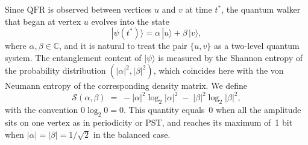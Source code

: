\documentclass[12pt]{amsart}
\newcommand{\QFR}{\mathrm{QFR}}
\begin{document}
Since $\QFR$ is observed between vertices $u$ and $v$ at time $t^*$, the quantum walker that
began at vertex $u$ evolves into the state
\[
  |\psi(t^*)\rangle = \alpha\,|u\rangle + \beta\,|v\rangle,
\]
where $\alpha, \beta \in \mathbb{C}$, and it is natural to treat the pair $\{u, v\}$ as a
two-level quantum system. The entanglement content of $|\psi\rangle$ is measured by the
Shannon entropy of the probability distribution $(|\alpha|^2, |\beta|^2)$, which coincides
here with the von Neumann entropy of the corresponding density matrix. We define
\begin{equation}\label{eqq01entropy}
  \mathcal{S}(\alpha, \beta)
  \;=\;
  -|\alpha|^2 \log_2 |\alpha|^2 \;-\; |\beta|^2 \log_2 |\beta|^2,
\end{equation}
with the convention $0 \log_2 0 = 0$. This quantity equals~0 when all the amplitude sits on
one vertex as in periodicity or PST, and reaches its maximum of~1 bit when
$|\alpha| = |\beta| = 1/\sqrt{2}$ in the balanced case.
\end{document}
